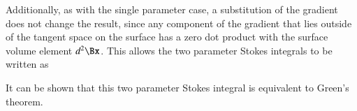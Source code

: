 
Additionally, as with the single parameter case, a substitution of the gradient does not change the result, since any component of the gradient that lies outside of the tangent space on the surface has a zero dot product with the surface volume element \( d^2 \Bx \).
This allows the two parameter Stokes integrals to be written as


It can be shown that this two parameter Stokes integral is equivalent to Green's theorem.
